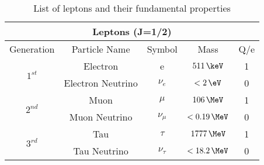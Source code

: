 \begin{table}[!htb]
  \centering
  \begin{tabular}{|c|c|c|c|c|}
  \hline
  \multicolumn{5}{|c|}{Leptons (J=1/2)} \\
  \hline
  Generation & Particle Name & Symbol & Mass & Q/e \\
  \hline
  \hline
  \multirow{2}{*}{$1^{st}$} & Electron          & e          &     $511\,\keV$ & 1 \\
                            & Electron Neutrino & $\nu_e$    &     $< 2\, \eV$ & 0 \\
  \hline
  \hline
  \multirow{2}{*}{$2^{nd}$} & Muon              & $\mu$      &  $   106\,\MeV$ & 1 \\
                            & Muon Neutrino     & $\nu_\mu$  &  $< 0.19\,\MeV$ & 0 \\
  \hline
  \hline
  \multirow{2}{*}{$3^{rd}$} & Tau               & $\tau$     & $   1777\,\MeV$ & 1 \\
                            & Tau Neutrino      & $\nu_\tau$ & $< 18.2 \,\MeV$ & 0 \\
  \hline
  \end{tabular}
  \caption[List of leptons and their fundamental properties]{List of leptons and their fundamental properties \cite{ARTICLE:PDG2014}}
  \label{TheoreticalIntroduction_LeptonProperties}
\end{table}
